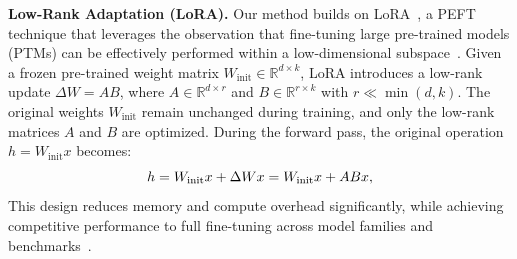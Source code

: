\documentclass[11pt]{article}
\begin{document}
\textbf{Low-Rank Adaptation (LoRA).} Our method builds on LoRA~\cite{hu2022lora}, a PEFT technique that leverages the observation that fine-tuning large pre-trained models (PTMs) can be effectively performed within a low-dimensional subspace~\cite{aghajanyan2020intrinsic}. Given a frozen pre-trained weight matrix $W_{\mathrm{init}} \in \mathbb{R}^{d \times k}$, LoRA introduces a low-rank update $\Delta W = AB$, where $A \in \mathbb{R}^{d \times r}$ and $B \in \mathbb{R}^{r \times k}$ with $r \ll \min(d, k)$. The original weights $W_{\mathrm{init}}$ remain unchanged during training, and only the low-rank matrices $A$ and $B$ are optimized. During the forward pass, the original operation $h = W_{\mathrm{init}} x$ becomes:
\vspace{-4pt}
\begin{equation}
    h = W_{\mathrm{init}} x + \Delta W x = W_{\mathrm{init}} x + ABx,
\vspace{-4pt}
\end{equation}
This design reduces memory and compute overhead significantly, while achieving competitive performance to full fine-tuning across model families and benchmarks~\cite{houlsby2019parameter}.

\end{document}
